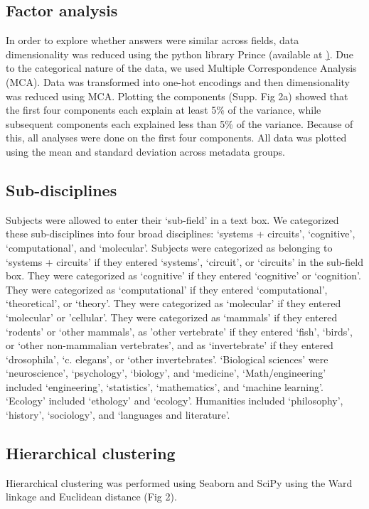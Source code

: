 \documentclass[a4paper, 11pt]{article}
\begin{document}
\subsection*{Factor analysis}
In order to explore whether answers were similar across fields, data dimensionality was reduced using the python library Prince (available at \href{https://github.com/MaxHalford/prince}). Due to the categorical nature of the data, we used Multiple Correspondence Analysis (MCA). Data was transformed into one-hot encodings and then dimensionality was reduced using MCA. Plotting the components (Supp. Fig 2a) showed that the first four components each explain at least 5\% of the variance, while subsequent components each explained less than 5\% of the variance. Because of this, all analyses were done on the first four components. All data was plotted using the mean and standard deviation across metadata groups.

\subsection*{Sub-disciplines}
Subjects were allowed to enter their `sub-field' in a text box. We categorized these sub-disciplines into four broad disciplines: `systems + circuits', `cognitive', `computational', and `molecular'. Subjects were categorized as belonging to `systems + circuits' if they entered `systems', `circuit', or `circuits' in the sub-field box. They were categorized as `cognitive' if they entered `cognitive' or `cognition'. They were categorized as `computational' if they entered `computational', `theoretical', or `theory'. They were categorized as `molecular' if they entered `molecular' or 'cellular'. They were categorized as `mammals' if they entered `rodents' or `other mammals', as 'other vertebrate' if they entered `fish', `birds', or `other non-mammalian vertebrates', and as `invertebrate' if they entered `drosophila', `c. elegans', or `other invertebrates'. `Biological sciences' were `neuroscience', `psychology', `biology', and `medicine', `Math/engineering' included `engineering', `statistics', `mathematics', and `machine learning'. `Ecology' included `ethology' and `ecology'. Humanities included `philosophy', `history', `sociology', and `languages and literature'.

\subsection*{Hierarchical clustering}
Hierarchical clustering was performed using Seaborn and SciPy \cite{2020SciPy-NMeth,waskom2020seaborn} using the Ward linkage and Euclidean distance (Fig 2).
\end{document}

